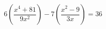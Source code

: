\begin{ex}[type=equation]
	\begin{condition}
		$6\left(\dfrac{x^4 + 81}{9x^2}\right) - 7\left(\dfrac{x^2 - 9}{3x}\right)  = 36$
	\end{condition}
\end{ex}